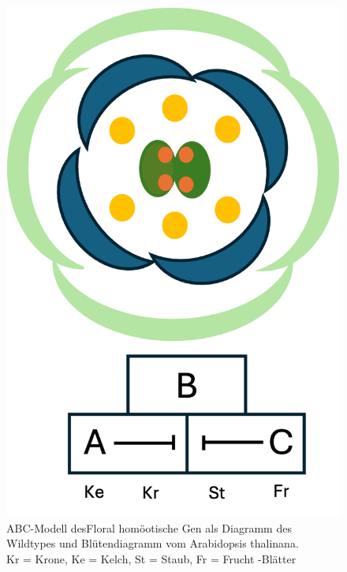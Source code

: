 \documentclass[10pt,a4paper]{article}
\begin{document}
		\begin{figure}[H]
			\centering
			\includegraphics[scale=0.85]{Wildtyp_diagramm.png}
			\caption{ABC-Modell desFloral homöotische Gen als Diagramm des Wildtypes und Blütendiagramm vom Arabidopsis thalinana.\\
			Kr = Krone, Ke = Kelch, St = Staub, Fr = Frucht -Blätter}
			\label{fig:floralgene_Wildtyp}
		\end{figure}
	
\end{document}
